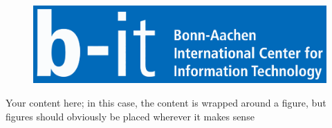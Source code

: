 

    {
        \begin{figure}
            \vspace{-1cm}
            \begin{tikzfigure}
                \includegraphics[scale=0.225]{figures/b-it.pdf}
            \end{tikzfigure}
        \end{figure}
        Your content here; in this case, the content is wrapped around a figure, but figures should obviously be placed wherever it makes sense
    }


